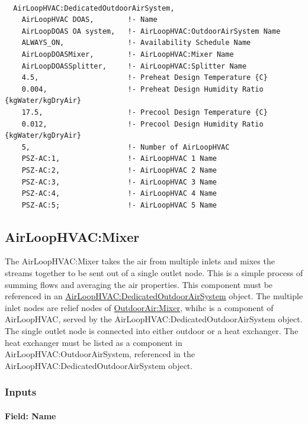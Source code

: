 \begin{lstlisting}

  AirLoopHVAC:DedicatedOutdoorAirSystem,
    AirLoopHVAC DOAS,        !- Name
    AirLoopDOAS OA system,   !- AirLoopHVAC:OutdoorAirSystem Name
    ALWAYS_ON,               !- Availability Schedule Name
    AirLoopDOASMixer,        !- AirLoopHVAC:Mixer Name
    AirLoopDOASSplitter,     !- AirLoopHVAC:Splitter Name
    4.5,                     !- Preheat Design Temperature {C}
    0.004,                   !- Preheat Design Humidity Ratio {kgWater/kgDryAir}
    17.5,                    !- Precool Design Temperature {C}
    0.012,                   !- Precool Design Humidity Ratio {kgWater/kgDryAir}
    5,                       !- Number of AirLoopHVAC
    PSZ-AC:1,                !- AirLoopHVAC 1 Name
    PSZ-AC:2,                !- AirLoopHVAC 2 Name
    PSZ-AC:3,                !- AirLoopHVAC 3 Name
    PSZ-AC:4,                !- AirLoopHVAC 4 Name
    PSZ-AC:5;                !- AirLoopHVAC 5 Name
\end{lstlisting}

\subsection{AirLoopHVAC:Mixer}\label{airloophvacmixer}

The AirLoopHVAC:Mixer takes the air from multiple inlets and mixes the streams together to be sent out of a single outlet node. This is a simple process of summing flows and averaging the air properties. This component must be referenced in an \hyperref[airloophvacdedicatedoutdoorairsystem]{AirLoopHVAC:DedicatedOutdoorAirSystem} object. The multiple inlet nodes are relief nodes of \hyperref[outdoorairmixe]{OutdoorAir:Mixer}, whihc is a component of AirLoopHVAC, served by the AirLoopHVAC:DedicatedOutdoorAirSystem object. The single outlet node is connected into either outdoor or a heat exchanger. The heat exchanger must be listed as a component in AirLoopHVAC:OutdoorAirSystem, referenced in the AirLoopHVAC:DedicatedOutdoorAirSystem object. 

\subsubsection{Inputs}\label{inputs-5-002}

\paragraph{Field: Name}\label{field-name-5-002}

